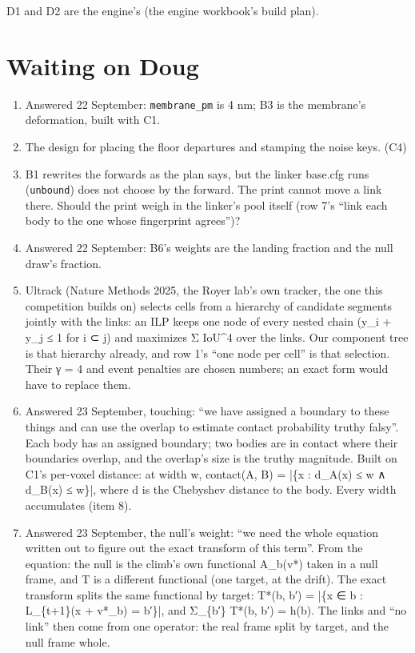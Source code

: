 D1 and D2 are the engine's (the engine workbook's build plan).

\section{\texorpdfstring{Waiting on Doug}{Waiting on Doug}}

\begin{enumerate}
\item Answered 22 September: \texttt{membrane\_\allowbreak{}pm} is 4 nm; B3 is the membrane's deformation, built with C1.
\item The design for placing the floor departures and stamping the noise keys. (C4)
\item B1 rewrites the forwards as the plan says, but the linker base.cfg runs (\texttt{unbound}) does not choose by the forward. The print cannot move a link there. Should the print weigh in the linker's pool itself (row 7's “link each body to the one whose fingerprint agrees”)?
\item Answered 22 September: B6's weights are the landing fraction and the null draw's fraction.
\item Ultrack (Nature Methods 2025, the Royer lab's own tracker, the one this competition builds on) selects cells from a hierarchy of candidate segments jointly with the links: an ILP keeps one node of every nested chain (y\_\allowbreak{}i + y\_\allowbreak{}j ≤ 1 for i ⊂ j) and maximizes Σ IoU\textasciicircum{}4 over the links. Our component tree is that hierarchy already, and row 1's “one node per cell” is that selection. Their γ = 4 and event penalties are chosen numbers; an exact form would have to replace them.
\item Answered 23 September, touching: “we have assigned a boundary to these things and can use the overlap to estimate contact probability truthy falsy”. Each body has an assigned boundary; two bodies are in contact where their boundaries overlap, and the overlap's size is the truthy magnitude. Built on C1's per-voxel distance: at width w, contact(A, B) = |\{x : d\_\allowbreak{}A(x) ≤ w ∧ d\_\allowbreak{}B(x) ≤ w\}|, where d is the Chebyshev distance to the body. Every width accumulates (item 8).
\item Answered 23 September, the null's weight: “we need the whole equation written out to figure out the exact transform of this term”. From the equation: the null is the climb's own functional A\_\allowbreak{}b(v*) taken in a null frame, and T is a different functional (one target, at the drift). The exact transform splits the same functional by target: T*(b, b′) = |\{x ∈ b : L\_\allowbreak{}\{t+1\}(x + v*\_\allowbreak{}b) = b′\}|, and Σ\_\allowbreak{}\{b′\} T*(b, b′) = h(b). The links and “no link” then come from one operator: the real frame split by target, and the null frame whole.

\end{enumerate}
